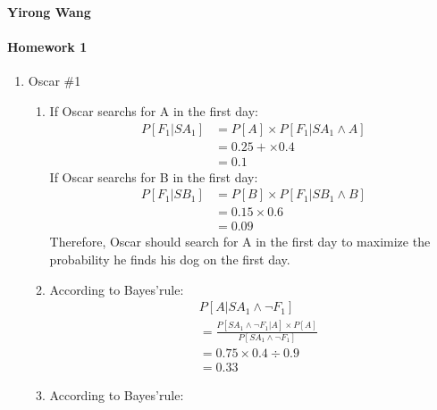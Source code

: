 \documentclass[11pt]{article}
\theoremstyle{definition}
\begin{document}
\renewcommand{\labelenumii}{{\bfseries \em \arabic{enumi}.\arabic{enumii}}}
\newcommand{\problemitem}{\renewcommand{\labelenumi}{{\bfseries \em Problem \arabic{enumi}}}\item}
\newcommand{\solutionitem}{\renewcommand{\labelenumi}{{\bfseries \em Solution \arabic{enumi}}}\addtocounter{enumi}{-1}\item}
\newenvironment{solution}{\par\color{DarkBlue}}{\par}
{\noindent \textbf{Yirong Wang} }

\paragraph{Homework 1}
\begin{enumerate}[leftmargin=0pt, itemsep=3ex]

    \problemitem Oscar \#1
        \begin{enumerate}
        \item 
        If Oscar searchs for A in the first day:
        \\
        \begin{align*}
            P[F_1|SA_1] &= P[A] \times P[F_1|SA_1 \land A]
            \\ &= 0.25 +\times 0.4
            \\ &= 0.1
        \end{align*}
        If Oscar searchs for B in the first day:
        \begin{align*}
            P[F_1|SB_1] &=P[B] \times P[F_1|SB_1\land B]
            \\ &= 0.15 \times 0.6
            \\ &= 0.09
        \end{align*}
        Therefore, Oscar should search for A in the first day to maximize the 
        probability he finds his dog on the first day.
    \item According to Bayes'rule:
    \\
    \begin{align*}
        & P[A | SA_1 \land \neg F_1] 
    \\& = \frac{P[SA_1 \land \neg F_1 | A] \times P[A]}{P[SA_1 \land \neg F_1]}
    \\& = 0.75 \times 0.4 \div 0.9
    \\& = 0.33
    \end{align*}
    

    \item 
    According to Bayes'rule:



\end{enumerate}
\end{enumerate}
\end{document}
